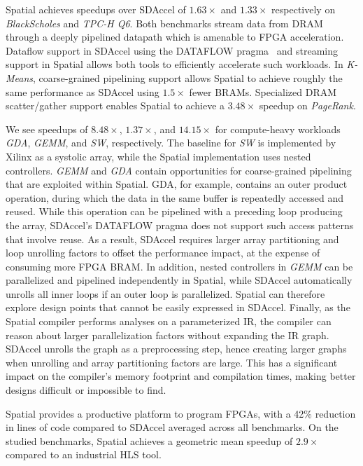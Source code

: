 Spatial achieves speedups over SDAccel of $1.63\times$ and $1.33\times$ respectively on \emph{BlackScholes} and \emph{TPC-H Q6}. Both benchmarks
stream data from DRAM through a deeply pipelined datapath which is amenable to FPGA acceleration. Dataflow support in SDAccel using the DATAFLOW pragma~\cite{dataflowRef} and streaming support in Spatial allows both tools to efficiently accelerate such workloads. In \emph{K-Means}, coarse-grained pipelining support allows Spatial to achieve roughly the same performance as SDAccel using $1.5\times$ fewer BRAMs.
Specialized DRAM scatter/gather support enables Spatial to achieve a $3.48\times$ speedup on \emph{PageRank}.

We see speedups of $8.48\times$, $1.37\times$, and $14.15\times$ for compute-heavy workloads \emph{GDA}, \emph{GEMM}, and \emph{SW}, respectively. The baseline for \emph{SW} is implemented by Xilinx as a systolic array, while the Spatial implementation uses nested controllers. \emph{GEMM} and \emph{GDA} contain opportunities for coarse-grained pipelining that are exploited within Spatial. 
GDA, for example, contains an outer product operation, during which the data in the same buffer is repeatedly accessed and reused. While this operation can be pipelined with a preceding loop producing the array, SDAccel's DATAFLOW pragma does not support such access patterns that involve reuse. As a result, SDAccel requires larger array partitioning and loop unrolling factors to offset the performance impact, at the expense of consuming more FPGA BRAM.
In addition, nested controllers in \emph{GEMM}
can be parallelized and pipelined independently in Spatial, while SDAccel automatically unrolls all inner loops if an outer loop is parallelized. Spatial can therefore explore
design points that cannot be easily expressed in SDAccel. Finally, as the Spatial compiler performs analyses on a parameterized IR, the compiler can reason about larger parallelization factors without expanding the IR graph.
SDAccel unrolls the graph as a preprocessing step, hence creating larger graphs when unrolling and array partitioning factors are large.
This has a significant impact on the compiler's memory footprint and compilation times, making better designs difficult or impossible to find.

Spatial provides a productive platform to program FPGAs, with a 42\% reduction in lines of code compared to SDAccel averaged across all benchmarks. On the studied benchmarks, Spatial achieves a geometric mean speedup of $2.9\times$ compared to an industrial HLS tool.


